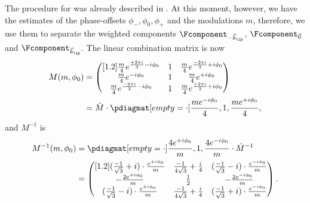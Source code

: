 The procedure for  was already described in .
At this moment, however, we have the estimates of the phase-offsets \(\phi_{-}, \phi_{0}, \phi_{+}\) and the 
    modulations \(m\),  therefore, we use them to separate the weighted components \(\Fcomponent_{-\vec{k}_\ip}\), 
    \(\Fcomponent_{\vec{0}}\) and \(\Fcomponent_{\vec{k}_\ip}\).
The linear combination matrix is now
    \begin{equation*}
        \begin{split}
            M(m, \phi_0) &= \begin{pmatrix}[1.2]
            \frac{m}{4} e^{\frac{+2\pi i}{3} - i\phi_0}             & 1 & \frac{m}{4} e^{\frac{-2\pi i}{3}+i\phi_0} \\
            \frac{m}{4}  e^{-i\phi_0} & 1 &  \frac{m}{4} e^{+i\phi_0}\\
             \frac{m}{4} e^{\frac{-2\pi i}{3} - i\phi_0}            & 1 &  \frac{m}{4} e^{\frac{+2\pi i}{3}+i\phi_0}\\
        \end{pmatrix} \\
        &= \tilde{M}\cdot \pdiagmat[ empty = {\cdot} ]{\frac{m e^{ -i\phi_0}}{4}, 1,  \frac{me^{+i\phi_0}}{4} },
        \end{split}
    \end{equation*}
    and \(M^{-1}\) is
    \begin{equation}
        \begin{split}
            M^{-1}(m, \phi_0) &= \pdiagmat[ empty = {\cdot} ]{\frac{4 e^{ +i\phi_0}}{m}, 1,  \frac{4e^{-i\phi_0}}{m} } \cdot
            \tilde{M}^{-1} \\
                &= \begin{pmatrix}[1.2]
                (\frac{-1}{\sqrt{3}} + i) \cdot \frac{e^{+i\phi_0}}{m} & \frac{-1}{4 \sqrt{3}} + \frac{i}{4} & (\frac{-1}{\sqrt{3}}
                - i) \cdot \frac{e^{-i\phi_0}}{m}\\
                -\frac{2e^{+i\phi_0}}{m} & \frac{1}{2} & -\frac{2e^{-i\phi_0}}{m} \\
                (\frac{-1}{\sqrt{3}} - i) \cdot \frac{e^{+i\phi_0}}{m} & \frac{-1}{4 \sqrt{3}} + \frac{i}{4} & (\frac{-1}{\sqrt{3}}
                + i) \cdot \frac{e^{-i\phi_0}}{m}
            \end{pmatrix}.
        \end{split}
    \end{equation}
